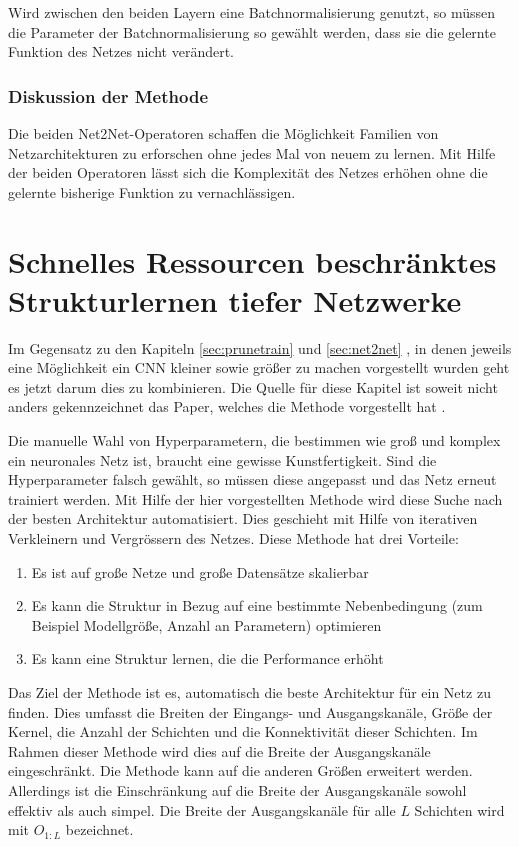 Wird zwischen den beiden Layern eine Batchnormalisierung genutzt, so müssen die Parameter der Batchnormalisierung so gewählt werden, dass sie die gelernte Funktion des Netzes nicht verändert.


\subsubsection{Diskussion der Methode}

Die beiden Net2Net-Operatoren schaffen die Möglichkeit Familien von Netzarchitekturen zu erforschen ohne jedes Mal von neuem zu lernen. Mit Hilfe der beiden Operatoren lässt sich die Komplexität des Netzes erhöhen ohne die gelernte bisherige Funktion zu vernachlässigen.


\section{Schnelles Ressourcen beschränktes Strukturlernen tiefer Netzwerke}
\color{blue1}
Im Gegensatz zu den Kapiteln \ref{sec:prunetrain} und \ref{sec:net2net} , in denen jeweils eine Möglichkeit ein CNN kleiner sowie größer zu machen vorgestellt wurden geht es jetzt darum dies zu kombinieren. Die Quelle für diese Kapitel ist soweit nicht anders gekennzeichnet das Paper, welches die Methode vorgestellt hat \cite{morphnet}.

Die manuelle Wahl von Hyperparametern, die bestimmen wie groß und komplex ein neuronales Netz ist, braucht eine gewisse Kunstfertigkeit. Sind die Hyperparameter falsch gewählt, so müssen diese angepasst und das Netz erneut trainiert werden. Mit Hilfe der hier vorgestellten Methode wird diese Suche nach der besten Architektur automatisiert. Dies geschieht mit Hilfe von iterativen Verkleinern und Vergrössern des Netzes. Diese Methode hat drei Vorteile:
\begin{enumerate}
 \item Es ist auf große Netze und große Datensätze skalierbar
 \item Es kann die Struktur in Bezug auf eine bestimmte Nebenbedingung (zum Beispiel Modellgröße, Anzahl an Parametern) optimieren
 \item Es kann eine Struktur lernen, die die Performance erhöht
\end{enumerate}

Das Ziel der Methode ist es, automatisch die beste Architektur für ein Netz zu finden. Dies umfasst die Breiten der Eingangs- und Ausgangskanäle, Größe der Kernel, die Anzahl der Schichten und die Konnektivität dieser Schichten. Im Rahmen dieser Methode wird dies auf die Breite der Ausgangskanäle eingeschränkt. Die Methode kann auf die anderen Größen erweitert werden. Allerdings ist die Einschränkung auf die Breite der Ausgangskanäle sowohl effektiv als auch simpel.
Die Breite der Ausgangskanäle für alle $L$ Schichten wird mit $O_{1:L}$ bezeichnet. 


